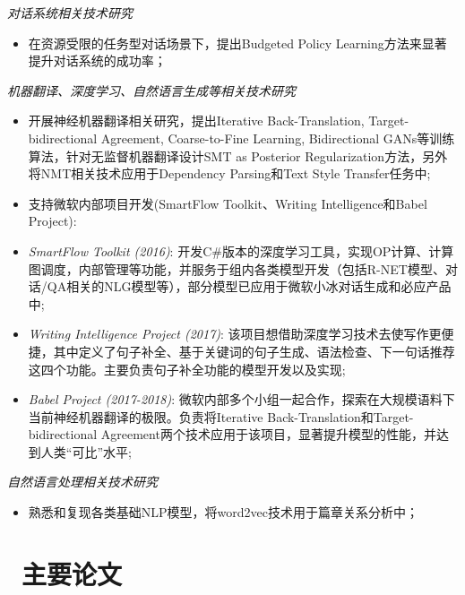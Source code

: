\documentclass{resume}
\begin{document}
\textit{对话系统相关技术研究}
\begin{itemize}
  \item 在资源受限的任务型对话场景下，提出Budgeted Policy Learning方法来显著提升对话系统的成功率；
\end{itemize}

\textit{机器翻译、深度学习、自然语言生成等相关技术研究}
\begin{itemize}
  \item 开展神经机器翻译相关研究，提出Iterative Back-Translation, Target-bidirectional Agreement, Coarse-to-Fine Learning, Bidirectional GANs等训练算法，针对无监督机器翻译设计SMT as Posterior Regularization方法，另外将NMT相关技术应用于Dependency Parsing和Text Style Transfer任务中;
  \item 支持微软内部项目开发(SmartFlow Toolkit、Writing Intelligence和Babel Project):
  \item[-] \emph{SmartFlow Toolkit (2016)}:  开发C\#版本的深度学习工具，实现OP计算、计算图调度，内部管理等功能，并服务于组内各类模型开发（包括R-NET模型、对话/QA相关的NLG模型等），部分模型已应用于微软小冰对话生成和必应产品中;
  \item[-] \emph{Writing Intelligence Project (2017)}: 该项目想借助深度学习技术去使写作更便捷，其中定义了句子补全、基于关键词的句子生成、语法检查、下一句话推荐这四个功能。主要负责句子补全功能的模型开发以及实现;
  \item[-] \emph{Babel Project (2017-2018)}: 微软内部多个小组一起合作，探索在大规模语料下当前神经机器翻译的极限。负责将Iterative Back-Translation和Target-bidirectional Agreement两个技术应用于该项目，显著提升模型的性能，并达到人类“可比”水平;
\end{itemize}

\textit{自然语言处理相关技术研究}
\begin{itemize}
  \item 熟悉和复现各类基础NLP模型，将word2vec技术用于篇章关系分析中；
\end{itemize}

\section{\faFilesO\ 主要论文}
\end{document}
